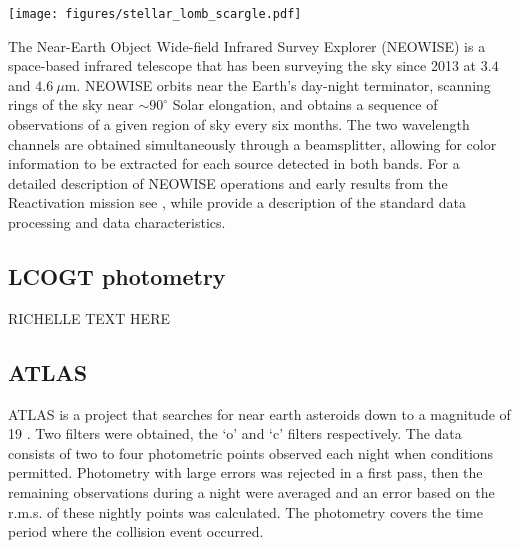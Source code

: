 \documentclass{aa}
\newcommand{\asas}{ASASSN-21qj}
\begin{document}
\begin{figure*}
\begin{centering}
\texttt{[image: figures/stellar\_lomb\_scargle.pdf]}
\caption{ASASSN photometry of \asas\ and the Lomb Scargle periodograms of the photometry in and out of the eclipse.
%
The blue and orange shaded regions in the top panel indicate the range of epochs put into the Lomb Scargle periodogram.
%
Middle panel: The periodograms over a range of 0 to 150 days.
%
Lower panel: The periodogram of the star outside of the eclipse over a range of 0 to 50 days.
}
\label{fig:starlombscargle}
\end{centering}
\end{figure*}

The Near-Earth Object Wide-field Infrared Survey Explorer (NEOWISE) is a space-based infrared telescope that has been surveying the sky since 2013 at $3.4$ and $4.6~\mu$m.
%
NEOWISE orbits near the Earth's day-night terminator, scanning rings of the sky near $\sim90^\circ$ Solar elongation, and obtains a sequence of observations of a given region of sky every six months.
%
The two wavelength channels are obtained simultaneously through a beamsplitter, allowing for color information to be extracted for each source detected in both bands.
%
For a detailed description of NEOWISE operations and early results from the Reactivation mission see \citet{mainzer14neowise}, while \citet{cutri15} provide a description of the standard data processing and data characteristics.
%

\subsection{LCOGT photometry}

RICHELLE TEXT HERE

\subsection{ATLAS}

ATLAS is a project that searches for near earth asteroids down to a magnitude of 19 \citep{Tonry18}.
%
Two filters were obtained, the `o' and `c' filters respectively.
%
The data consists of two to four photometric points observed each night when conditions permitted.
%
Photometry with large errors was rejected in a first pass, then the remaining observations during a night were averaged and an error based on the r.m.s. of these nightly points was calculated.
%
The photometry covers the time period where the collision event occurred. 
\end{document}
